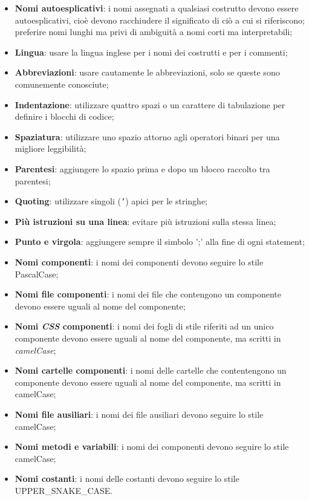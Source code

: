 \documentclass[10pt, a4paper]{article}
\begin{document}
\begin{itemize}
    \item \textbf{Nomi autoesplicativi}: i nomi assegnati a qualsiasi costrutto devono essere autoesplicativi, cioè devono racchiudere il significato di ciò a cui si riferiscono;
        preferire nomi lunghi ma privi di ambiguità a nomi corti ma interpretabili;
    \item \textbf{Lingua}: usare la lingua inglese per i nomi dei costrutti e per i commenti;
    \item \textbf{Abbreviazioni}: usare cautamente le abbreviazioni, solo se queste sono comunemente conosciute;
    \item \textbf{Indentazione}: utilizzare quattro spazi o un carattere di tabulazione per definire i blocchi di codice;
    \item \textbf{Spaziatura}: utilizzare uno spazio attorno agli operatori binari per una migliore leggibilità;
    \item \textbf{Parentesi}: aggiungere lo spazio prima e dopo un blocco raccolto tra parentesi;
    \item \textbf{Quoting}: utilizzare singoli (\texttt{'}) apici per le stringhe;
    \item \textbf{Più istruzioni su una linea}: evitare più istruzioni sulla stessa linea;
    \item \textbf{Punto e virgola}: aggiungere sempre il simbolo ';' alla fine di ogni statement;
    \item \textbf{Nomi componenti}: i nomi dei componenti devono seguire lo stile PascalCase;
    \item \textbf{Nomi file componenti}: i nomi dei file che contengono un componente devono essere uguali al nome del componente;
    \item \textbf{Nomi \textit{CSS\pg} componenti}: i nomi dei fogli di stile riferiti ad un unico componente devono essere uguali al nome del componente, ma scritti in \textit{camelCase\pg};
    \item \textbf{Nomi cartelle componenti}: i nomi delle cartelle che contentengono un componente devono essere uguali al nome del componente, ma scritti in camelCase;
    \item \textbf{Nomi file ausiliari}: i nomi dei file ausiliari devono seguire lo stile camelCase;
    \item \textbf{Nomi metodi e variabili}: i nomi dei componenti devono seguire lo stile camelCase;
    \item \textbf{Nomi costanti}: i nomi delle costanti devono seguire lo stile UPPER\_SNAKE\_CASE.
    \end{itemize}
\end{document}
